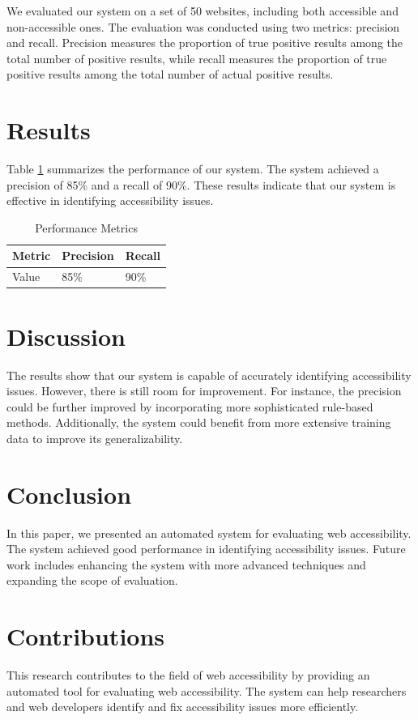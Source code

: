 \documentclass{article}
\begin{document}
We evaluated our system on a set of 50 websites, including both accessible and non-accessible ones. The evaluation was conducted using two metrics: precision and recall. Precision measures the proportion of true positive results among the total number of positive results, while recall measures the proportion of true positive results among the total number of actual positive results.

\section{Results}
Table \ref{tab:results} summarizes the performance of our system. The system achieved a precision of 85\% and a recall of 90\%. These results indicate that our system is effective in identifying accessibility issues.

\begin{table}[ht]
\centering
\caption{Performance Metrics}
\label{tab:results}
\begin{tabular}{lll}
\toprule
Metric & Precision & Recall \\
\midrule
Value & 85\% & 90\% \\
\bottomrule
\end{tabular}
\end{table}

\section{Discussion}
The results show that our system is capable of accurately identifying accessibility issues. However, there is still room for improvement. For instance, the precision could be further improved by incorporating more sophisticated rule-based methods. Additionally, the system could benefit from more extensive training data to improve its generalizability.

\section{Conclusion}
In this paper, we presented an automated system for evaluating web accessibility. The system achieved good performance in identifying accessibility issues. Future work includes enhancing the system with more advanced techniques and expanding the scope of evaluation.

\section{Contributions}
This research contributes to the field of web accessibility by providing an automated tool for evaluating web accessibility. The system can help researchers and web developers identify and fix accessibility issues more efficiently.



\end{document}

